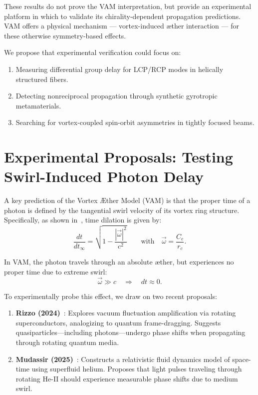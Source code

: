         These results do not prove the VAM interpretation, but provide an experimental platform in which to validate its chirality-dependent propagation predictions. VAM offers a physical mechanism — vortex-induced æther interaction — for these otherwise symmetry-based effects.

        We propose that experimental verification could focus on:
        \begin{enumerate}
            \item Measuring differential group delay for LCP/RCP modes in helically structured fibers.
            \item Detecting nonreciprocal propagation through synthetic gyrotropic metamaterials.
            \item Searching for vortex-coupled spin-orbit asymmetries in tightly focused beams.
        \end{enumerate}


\section{Experimental Proposals: Testing Swirl-Induced Photon Delay}\label{sec:swirl-delay-exp}

        A key prediction of the Vortex \AE ther Model (VAM) is that the proper time of a photon is defined by the tangential swirl velocity of its vortex ring structure. Specifically, as shown in~\cite{iskandarani2025b}, time dilation is given by:
        \begin{equation}
            \frac{dt}{dt_\infty} = \sqrt{1 - \frac{|\vec{\omega}|^2}{c^2}} \qquad \text{with} \quad \vec{\omega} = \frac{C_e}{r_c}.
        \end{equation}

        In VAM, the photon travels through an absolute æther, but experiences no proper time due to extreme swirl:
        \[
            \vec{\omega} \gg c \quad \Rightarrow \quad dt \approx 0.
        \]

        To experimentally probe this effect, we draw on two recent proposals:

        \begin{enumerate}
            \item \textbf{Rizzo (2024)}~\cite{rizzo2024rotating}: Explores vacuum fluctuation amplification via rotating superconductors, analogizing to quantum frame-dragging. Suggests quasiparticles—including photons—undergo phase shifts when propagating through rotating quantum media.

            \item \textbf{Mudassir (2025)}~\cite{mudassir2025fluid}: Constructs a relativistic fluid dynamics model of space-time using superfluid helium. Proposes that light pulses traveling through rotating He-II should experience measurable phase shifts due to medium swirl.
        \end{enumerate}

